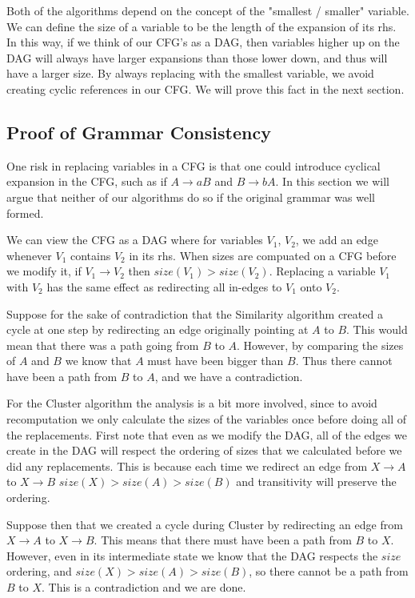 \documentclass[11pt]{article}
\begin{document}
Both of the algorithms depend on the concept of the "smallest / smaller"
variable. We can define the size of a variable to be the length of the
expansion of its rhs. In this way, if we think of our CFG's as a DAG, then
variables higher up on the DAG will always have larger expansions than those
lower down, and thus will have a larger size. By always replacing with the
smallest variable, we avoid creating cyclic references in our CFG.  We will
prove this fact in the next section.

\subsection{Proof of Grammar Consistency}

One risk in replacing variables in a CFG is that one could introduce cyclical
expansion in the CFG, such as if $A\rightarrow aB$ and $B\rightarrow bA$. In
this section we will argue that neither of our algorithms do so if the original
grammar was well formed.

We can view the CFG as a DAG where for variables $V_1$, $V_2$, we add an edge
whenever $V_1$ contains $V_2$ in its rhs. When sizes are compuated on a CFG
before we modify it, if $V_1 \rightarrow V_2$ then $size(V_1) > size(V_2)$.
Replacing a variable $V_1$ with $V_2$ has the same effect as redirecting all
in-edges to $V_1$ onto $V_2$.

Suppose for the sake of contradiction that the Similarity algorithm created a
cycle at one step by redirecting an edge originally pointing at $A$ to $B$.
This would mean that there was a path going from $B$ to $A$. However, by
comparing the sizes of $A$ and $B$ we know that $A$ must have been bigger than
$B$. Thus there cannot have been a path from $B$ to $A$, and we have a
contradiction.

For the Cluster algorithm the analysis is a bit more involved, since to avoid
recomputation we only calculate the sizes of the variables once before doing
all of the replacements. First note that even as we modify the DAG, all of the
edges we create in the DAG will respect the ordering of sizes that we
calculated before we did any replacements. This is because each time we
redirect an edge from $X\rightarrow A$ to $X\rightarrow B$
$size(X)>size(A)>size(B)$ and transitivity will preserve the ordering.

Suppose then that we created a cycle during Cluster by redirecting an edge from
$X \rightarrow A$ to $X \rightarrow B$.  This means that there must have been a
path from $B$ to $X$. However, even in its intermediate state we know that the
DAG respects the $size$ ordering, and $size(X) > size(A) > size(B)$, so there
cannot be a path from $B$ to $X$. This is a contradiction and we are done.
\end{document}
